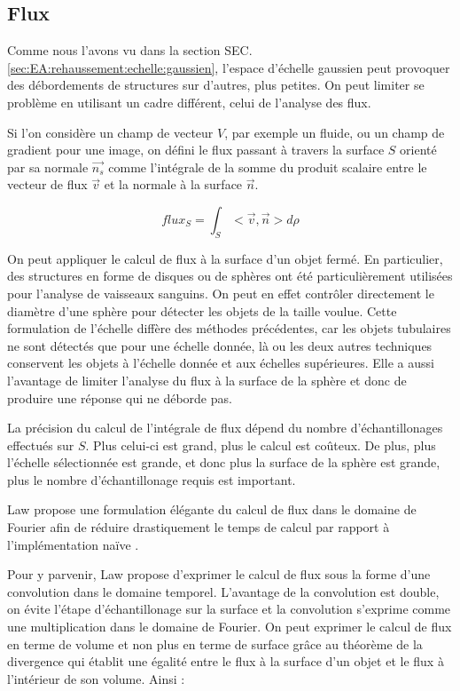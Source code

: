 \subsection{Flux}
\label{sec:EA:rehaussement:echelle:flux}

Comme nous l'avons vu dans la section SEC. \ref{sec:EA:rehaussement:echelle:gaussien}, l'espace d'échelle gaussien peut provoquer des débordements de structures sur d'autres, plus petites. On peut limiter se problème en utilisant un cadre différent, celui de l'analyse des flux.

Si l'on considère un champ de vecteur $V$, par exemple un fluide, ou un champ de gradient pour une image, on défini le flux passant à travers la surface $S$ orienté par sa normale $\vec{n_s}$ comme l'intégrale de la somme du produit scalaire entre le vecteur de flux $\vec{v}$ et la normale à la surface $\vec{n}$.

\begin{equation}
flux_S = \int_{S}< \vec{v},\vec{n} > d\rho
\end{equation}

On peut appliquer le calcul de flux à la surface d'un objet fermé. En particulier, des structures en forme de disques ou de sphères ont été particulièrement utilisées pour l'analyse de vaisseaux sanguins. On peut en effet contrôler directement le diamètre d'une sphère pour détecter les objets de la taille voulue. Cette formulation de l'échelle diffère des méthodes précédentes, car les objets tubulaires ne sont détectés que pour une échelle donnée, là ou les deux autres techniques conservent les objets à l'échelle donnée et aux échelles supérieures. Elle a aussi l'avantage de limiter l'analyse du flux à la surface de la sphère et donc de produire une réponse qui ne déborde pas.

La précision du calcul de l'intégrale de flux dépend du nombre d'échantillonages effectués sur $S$. Plus celui-ci est grand, plus le calcul est coûteux. De plus, plus l'échelle sélectionnée est grande, et donc plus la surface de la sphère est grande, plus le nombre d'échantillonage requis est important.

Law propose une formulation élégante du calcul de flux dans le domaine de Fourier afin de réduire drastiquement le temps de calcul par rapport à l'implémentation naïve \cite{Law2009_efficient_implementation}.

Pour y parvenir, Law propose d'exprimer le calcul de flux sous la forme d'une convolution dans le domaine temporel. L'avantage de la convolution est double, on évite l'étape d'échantillonage sur la surface et la convolution s'exprime comme une multiplication dans le domaine de Fourier. On peut exprimer le calcul de flux en terme de volume et non plus en terme de surface grâce au théorème de la divergence qui établit une égalité entre le flux à la surface d'un objet et le flux à l'intérieur de son volume. Ainsi :


